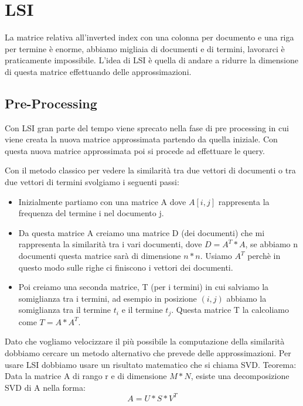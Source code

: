 \documentclass[14pt]{extreport}
\begin{document}
\chapter{LSI}

La matrice relativa all'inverted index con una colonna per documento e una riga per termine è enorme, abbiamo migliaia di documenti e di termini, lavorarci è praticamente impossibile. L'idea di LSI è quella di andare a ridurre la dimensione di questa matrice effettuando delle approssimazioni.

\section{Pre-Processing}

Con LSI gran parte del tempo viene sprecato nella fase di pre processing in cui viene creata la nuova matrice approssimata partendo da quella iniziale. Con questa nuova matrice approssimata poi si procede ad effettuare le query.

Con il metodo classico per vedere la similarità tra due vettori di documenti o tra due vettori di termini svolgiamo i seguenti passi:
\begin{itemize}
    \item Inizialmente partiamo con una matrice A dove $A[i,j]$ rappresenta la frequenza del termine i nel documento j.
    \item Da questa matrice A creiamo una matrice D (dei documenti) che mi rappresenta la similarità tra i vari documenti, dove $D=A^T*A$, se abbiamo n documenti questa matrice sarà di dimensione $n*n$. Usiamo $A^T$ perchè in questo modo sulle righe ci finiscono i vettori dei documenti.
    \item Poi creiamo una seconda matrice, T (per i termini) in cui salviamo la somiglianza tra i termini, ad esempio in posizione $(i,j)$ abbiamo la somiglianza tra il termine $t_i$ e il termine $t_j$. Questa matrice T la calcoliamo come $T=A*A^T$.
\end{itemize}

Dato che vogliamo velocizzare il più possibile la computazione della similarità dobbiamo cercare un metodo alternativo che prevede delle approssimazioni.
Per usare LSI dobbiamo usare un risultato matematico che si chiama SVD.
\newline
Teorema: Data la matrice A di rango r e di dimensione $M*N$, esiste una decomposizione SVD di A nella forma:
\begin{equation}
    A=U*S* V^T
\end{equation}
\end{document}
